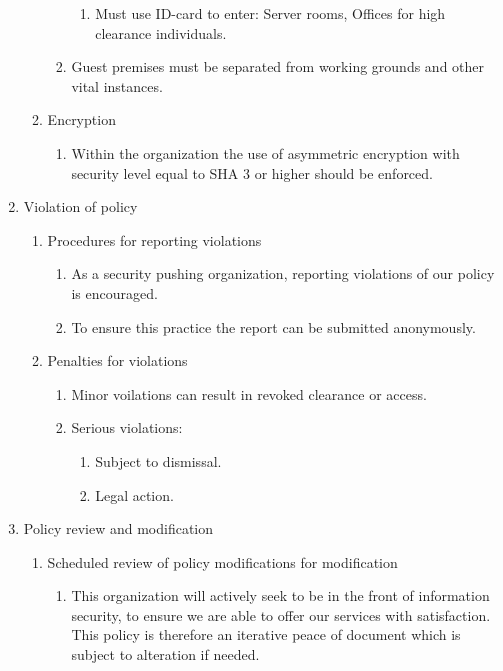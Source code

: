 \begin{enumerate}
\begin{enumerate}
\begin{enumerate}
\begin{enumerate}
        \item Must use ID-card to enter: Server rooms, Offices for high clearance individuals.
      \end{enumerate}
      \item Guest premises must be separated from working grounds and other vital instances.
    \end{enumerate}
    \item Encryption
    \begin{enumerate}
      \item Within the organization the use of asymmetric encryption with security level equal to SHA 3 or higher should be enforced.
    \end{enumerate}
  \end{enumerate}
  \item Violation of policy
  \begin{enumerate}
    \item Procedures for reporting violations
    \begin{enumerate}
      \item As a security pushing organization, reporting violations of our policy is encouraged.
      \item To ensure this practice the report can be submitted anonymously.
    \end{enumerate}
      \item Penalties for violations
    \begin{enumerate}
      \item Minor voilations can result in revoked clearance or access.
      \item Serious violations:
      \begin{enumerate}
        \item Subject to dismissal.
        \item Legal action.
      \end{enumerate}
    \end{enumerate}
  \end{enumerate}
  \item Policy review and modification
  \begin{enumerate}
    \item Scheduled review of policy modifications for modification
    \begin{enumerate}
      \item This organization will actively seek to be in the front of information security, to ensure we are able to offer our services with satisfaction. This policy is therefore an iterative peace of document which is subject to alteration if needed.

\end{enumerate}
\end{enumerate}
\end{enumerate}
